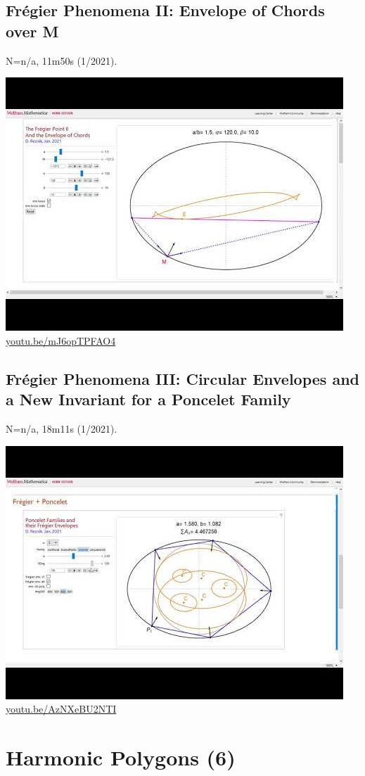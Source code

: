 \documentclass[12pt]{amsart}
\begin{document}
\subsection{Frégier Phenomena II: Envelope of Chords over M}
\label{vid:mJ6opTPFAO4}
\noindent N=n/a, 11m50s (1/2021). 
\begin{center}\includegraphics[width=.5\textwidth]{pics/mJ6opTPFAO4.jpg} \\ 
\href{https://youtu.be/mJ6opTPFAO4}{\url{youtu.be/mJ6opTPFAO4}}\end{center}
% 

\subsection{Frégier Phenomena III: Circular Envelopes and a New Invariant for a Poncelet Family}
\label{vid:AzNXeBU2NTI}
\noindent N=n/a, 18m11s (1/2021). 
\begin{center}\includegraphics[width=.5\textwidth]{pics/AzNXeBU2NTI.jpg} \\ 
\href{https://youtu.be/AzNXeBU2NTI}{\url{youtu.be/AzNXeBU2NTI}}\end{center}
% 


\section{Harmonic Polygons (6)}
\end{document}
